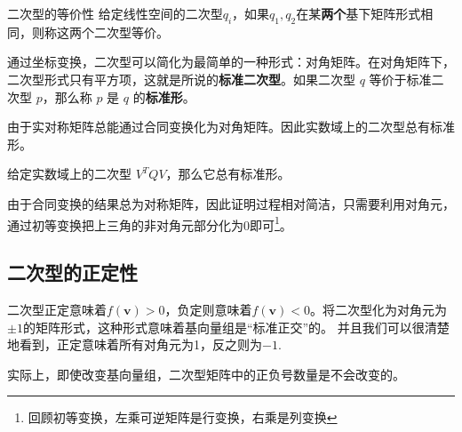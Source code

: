 \begin{definition}{二次型的等价性}
给定线性空间的二次型$q_i$，如果$q_1,q_2$在某\textbf{两个}基下矩阵形式相同，则称这两个二次型等价。
\end{definition}

通过坐标变换，二次型可以简化为最简单的一种形式：对角矩阵。在对角矩阵下，二次型形式只有平方项，这就是所说的\textbf{标准二次型}。如果二次型 $q$
等价于标准二次型 $p$，那么称 $p$ 是 $q$ 的\textbf{标准形}。

由于实对称矩阵总能通过合同变换化为对角矩阵。因此实数域上的二次型总有标准形。
\begin{theorem}{}
给定实数域上的二次型 $V^T QV$，那么它总有标准形。
\end{theorem}
由于合同变换的结果总为对称矩阵，因此证明过程相对简洁，只需要利用对角元，通过初等变换把上三角的非对角元部分化为0即可\footnote{回顾初等变换，左乘可逆矩阵是行变换，右乘是列变换}。
\subsection{二次型的正定性}
二次型正定意味着$f(\textbf{v})>0$，负定则意味着$f(\textbf{v})< 0$。将二次型化为对角元为$\pm 1$的矩阵形式，这种形式意味着基向量组是“标准正交”的。
并且我们可以很清楚地看到，正定意味着所有对角元为1，反之则为$-1$.

实际上，即使改变基向量组，二次型矩阵中的正负号数量是不会改变的。

